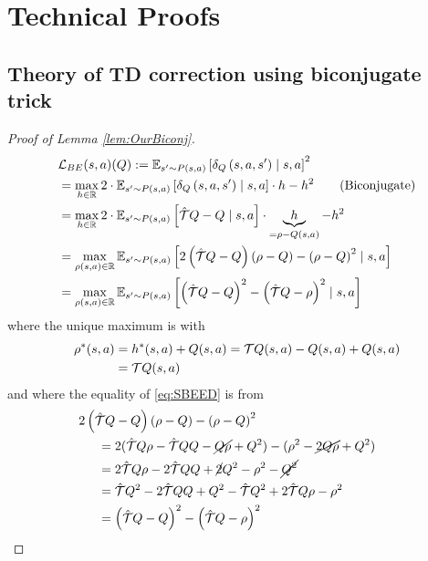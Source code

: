 \section{Technical Proofs}

\subsection{Theory of TD correction using biconjugate trick}\label{sec:BiconjProofs}


\begin{proof}[Proof of Lemma \ref{lem:OurBiconj}]
      \begin{align}
     &\mathcal{L}_{BE}(s,a)(Q):=\mathbb{E}_{ s^\prime \sim P(s, a)}\left[\delta_{Q}\left(s,a, s^\prime\right)\mid s, a\right]^2\notag
     \\
     &=\max_{h\in \mathbb{R}}2\cdot\mathbb{E}_{ s^\prime \sim P(s, a)}\left[\delta_{Q}\left(s,a, s^\prime\right)\mid s, a\right]\cdot h-h^2\tag{Biconjugate}
     \\
     &=\max_{h\in \mathbb{R}}2\cdot\mathbb{E}_{ s^\prime \sim P(s, a)}\left[\hat{\mathcal{T}}Q - Q\mid s, a\right]\cdot \underbrace{h}_{=\rho-Q(s,a)}-h^2\notag
    \\
     &=\max_{\rho(s,a)\in \mathbb{R}}\mathbb{E}_{ s^\prime \sim P(s, a)}\left[2\left(\hat{\mathcal{T}}Q - Q\right)\left(\rho-Q\right)
    -\left(\rho-Q\right)^2\mid s, a\right]\notag
    \\
    &= \max_{\rho(s,a)\in \mathbb{R}}\mathbb{E}_{ s^\prime \sim P(s, a)}\left[   \left(\hat{\mathcal{T}}{Q}-Q\right)^2-\left(\hat{\mathcal{T}}{Q}- \rho\right)^2\mid s, a\right]\label{eq:SBEED} 
    \end{align}
where the unique maximum is with 
\begin{align}
    \rho^{*}(s,a) &= h^{*}(s,a)+Q(s,a) = \mathcal{T}Q(s,a)- Q(s,a)+Q(s,a)\notag
    \\    &=\mathcal{T}Q(s,a)\notag
\end{align}
and where the equality of \ref{eq:SBEED} is from
\begin{align}
&\!\!\!\!\!\!\!\!\!2\left(\hat{\mathcal{T}}Q - Q\right)\left(\rho-Q\right)
    -\left(\rho-Q\right)^2\notag
    \\
    &=2(\hat{\mathcal{T}}{Q}\rho - \hat{\mathcal{T}}{Q}Q - \cancel{Q\rho} + Q^2)  - (\rho^2 - \cancel{2Q\rho} + Q^2)\notag
    \\
    &=2\hat{\mathcal{T}}{Q}\rho - 2\hat{\mathcal{T}}{Q}Q +\cancel{2} Q^2- \rho^2 - \cancel{Q^2}\notag
    \\
    &=\hat{\mathcal{T}}{Q}^2- 2\hat{\mathcal{T}}{Q}Q+Q^2-\hat{\mathcal{T}}{Q}^2+2\hat{\mathcal{T}}{Q}\rho- \rho^2\notag
    \\
    &=\left(\hat{\mathcal{T}}{Q}-Q\right)^2-\left(\hat{\mathcal{T}}{Q}- \rho\right)^2\notag
\end{align}


\end{proof}
